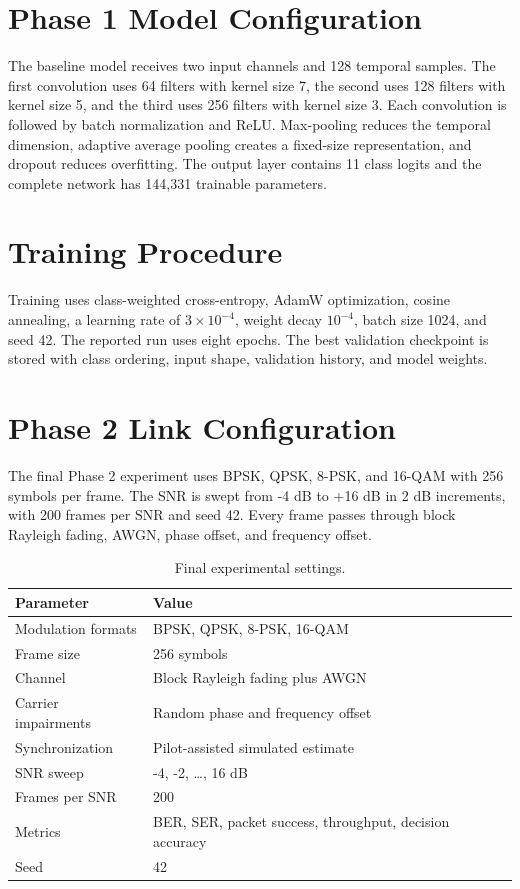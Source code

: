 \section{Phase 1 Model Configuration}
The baseline model receives two input channels and 128 temporal samples. The
first convolution uses 64 filters with kernel size 7, the second uses 128
filters with kernel size 5, and the third uses 256 filters with kernel size 3.
Each convolution is followed by batch normalization and ReLU. Max-pooling
reduces the temporal dimension, adaptive average pooling creates a fixed-size
representation, and dropout reduces overfitting. The output layer contains
11 class logits and the complete network has 144,331 trainable parameters.

\section{Training Procedure}
Training uses class-weighted cross-entropy, AdamW optimization, cosine
annealing, a learning rate of $3\times10^{-4}$, weight decay $10^{-4}$,
batch size 1024, and seed 42. The reported run uses eight epochs. The best
validation checkpoint is stored with class ordering, input shape, validation
history, and model weights.

\section{Phase 2 Link Configuration}
The final Phase 2 experiment uses BPSK, QPSK, 8-PSK, and 16-QAM with 256
symbols per frame. The SNR is swept from -4 dB to +16 dB in 2 dB increments,
with 200 frames per SNR and seed 42. Every frame passes through block
Rayleigh fading, AWGN, phase offset, and frequency offset.

\begin{table}[H]
\centering
\caption{Final experimental settings.}
\begin{tabular}{p{6cm} p{7cm}}
\hline
\textbf{Parameter} & \textbf{Value}\\
\hline
Modulation formats & BPSK, QPSK, 8-PSK, 16-QAM\\
Frame size & 256 symbols\\
Channel & Block Rayleigh fading plus AWGN\\
Carrier impairments & Random phase and frequency offset\\
Synchronization & Pilot-assisted simulated estimate\\
SNR sweep & -4, -2, \ldots, 16 dB\\
Frames per SNR & 200\\
Metrics & BER, SER, packet success, throughput, decision accuracy\\
Seed & 42\\
\hline
\end{tabular}
\end{table}

